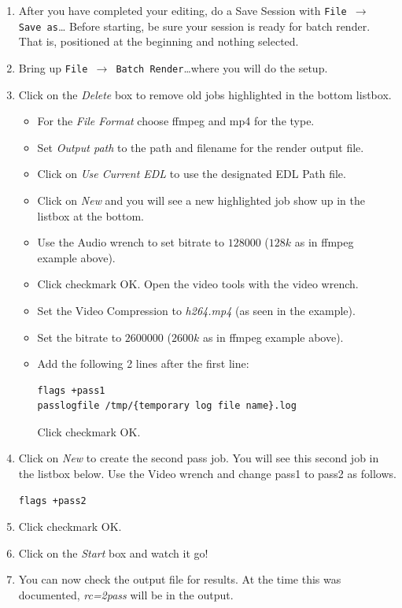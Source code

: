\begin{enumerate}
    \item After you have completed your editing, do a Save Session with \texttt{File $\rightarrow$ Save as}\dots
    Before starting, be sure your session is ready for batch render. That is, positioned at the beginning and nothing selected.
    \item Bring up \texttt{File $\rightarrow$ Batch Render}\dots where you will do the setup.
    \item Click on the \textit{Delete} box  to remove old jobs highlighted in the bottom listbox.
    \begin{itemize}
        \item For the \textit{File Format} choose ffmpeg and mp4 for the type.
        \item Set \textit{Output path} to the path and filename for the render output file.
        \item Click on \textit{Use Current EDL} to use the designated EDL Path file.
        \item Click on \textit{New} and you will see a new highlighted job show up in the listbox at the bottom.
        \item Use the Audio wrench to set bitrate to $128000$ ($128k$ as in ffmpeg example above).
        \item Click checkmark OK.  Open the video tools with the video wrench.
        \item Set the Video Compression to \textit{h264.mp4} (as seen in the example).
        \item Set the bitrate to $2600000$ ($2600k$ as in ffmpeg example above).
        \item Add the following 2 lines after the first line:
        \begin{lstlisting}[language=bash,numbers=none]
flags +pass1
passlogfile /tmp/{temporary log file name}.log
        \end{lstlisting}
        Click checkmark OK.
    \end{itemize}    
    \item Click on \textit{New} to create the second pass job.  You will see this second job in the listbox below.
     Use the Video wrench and change pass1 to pass2 as follows.
        \begin{lstlisting}[language=bash,numbers=none]
flags +pass2
        \end{lstlisting}
    \item Click checkmark OK.
    \item Click on the \textit{Start} box and watch it go!
    \item You can now check the output file for results.  At the time this was documented, \textit{rc=2pass} will be
        in the output.    
\end{enumerate}

